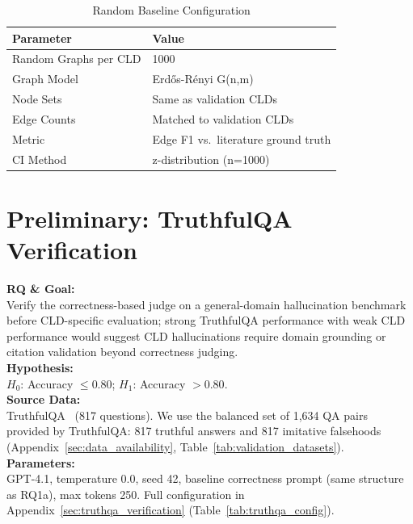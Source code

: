 \begin{table}[H]
\centering
\caption{Random Baseline Configuration}
\label{tab:random_baseline_config}
\footnotesize
\begin{tabular}{@{}ll@{}}
\toprule
\textbf{Parameter} & \textbf{Value} \\
\midrule
Random Graphs per CLD & 1000 \\
Graph Model & Erd\H{o}s-R\'enyi G(n,m) \\
Node Sets & Same as validation CLDs \\
Edge Counts & Matched to validation CLDs \\
Metric & Edge F1 vs.\ literature ground truth \\
CI Method & z-distribution (n=1000) \\
\bottomrule
\end{tabular}
\end{table}

\section{Preliminary: TruthfulQA Verification}
\label{sec:rq1_verification}

\noindent\textbf{RQ \& Goal:}\\
Verify the correctness-based judge on a general-domain hallucination benchmark before CLD-specific evaluation; strong TruthfulQA performance with weak CLD performance would suggest CLD hallucinations require domain grounding or citation validation beyond correctness judging.\\
\textbf{Hypothesis:}\\
$H_0$: Accuracy $\leq 0.80$; $H_1$: Accuracy $> 0.80$.\\
\textbf{Source Data:}\\
TruthfulQA~\cite{lin2022truthfulqameasuringmodelsmimic} (817 questions). We use the balanced set of 1{,}634 QA pairs provided by TruthfulQA: 817 truthful answers and 817 imitative falsehoods (Appendix~\ref{sec:data_availability}, Table~\ref{tab:validation_datasets}).\\
\textbf{Parameters:}\\
GPT-4.1, temperature 0.0, seed 42, baseline correctness prompt (same structure as RQ1a), max tokens 250. Full configuration in Appendix~\ref{sec:truthqa_verification} (Table~\ref{tab:truthqa_config}).\\

